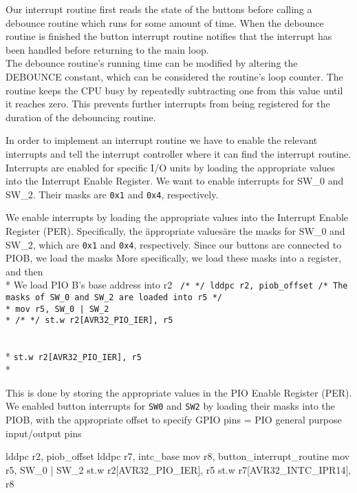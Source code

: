 Our interrupt routine first reads the state of the buttons before calling a debounce routine which runs for some amount of time.
When the debounce routine is finished the button interrupt routine notifies that the interrupt has been handled before returning to the main loop.
\\ %
The debounce routine's running time can be modified by altering the DEBOUNCE constant, which can be considered the routine's loop counter. The routine keeps the CPU busy by repeatedly subtracting one from this value until it reaches zero. This prevents further interrupts from being registered for the duration of the debouncing routine.

In order to implement an interrupt routine we have to enable the relevant interrupts and tell the interrupt controller where it can find the interrupt routine.
Interrupts are enabled for specific I/O units by loading the appropriate values into the Interrupt Enable Register.
We want to enable interrupts for SW_0 and SW_2.
Their masks are \texttt{0x1} and \texttt{0x4}, respectively.


We enable interrupts by loading the appropriate values into the Interrupt Enable Register (PER).
Specifically, the \"appropriate values\" are the masks for SW_0 and SW_2, which are \texttt{0x1} and \texttt{0x4}, respectively.
Since our buttons are connected to PIOB, we load the masks
More specifically, we load these masks into a register, and then 
\\*
We load PIO B's base address into r2
\texttt{
		/* */
		lddpc r2, piob_offset
		/* The masks of SW_0 and SW_2 are loaded into r5 */\\*
		mov r5, SW_0 | SW_2  \\*
		/* */
		st.w r2[AVR32_PIO_IER], r5
}

\\* %
\texttt{st.w r2[AVR32_PIO_IER], r5}
\\*

This is done by storing the appropriate values in the PIO Enable Register (PER).
We enabled button interrupts for \texttt{SW0} and \texttt{SW2} by loading their masks into the PIOB, with the appropriate offset to specify
GPIO pins = PIO
general purpose input/output pins

lddpc r2, piob_offset
lddpc r7, intc_base
mov r8, button_interrupt_routine
mov r5, SW_0 | SW_2
st.w r2[AVR32_PIO_IER], r5 
st.w r7[AVR32_INTC_IPR14], r8

